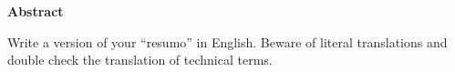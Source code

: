 
\begin{center}
\huge{{\bf Abstract}}
\vspace{2cm}
\end{center}

Write a version of your ``resumo'' in English. Beware of literal translations and double check the translation of technical terms.
 

 
\clearpage
\thispagestyle{empty}
\cleardoublepage

